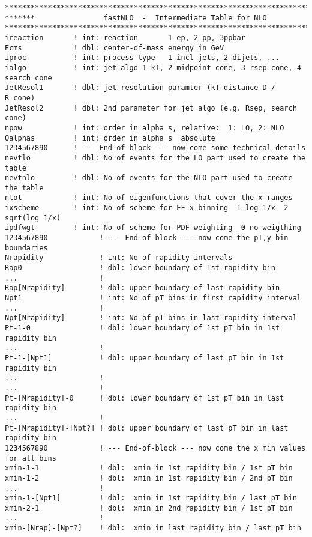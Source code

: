 {\small \footnotesize
\begin{verbatim} 
******************************************************************************
*******                fastNLO  -  Intermediate Table for NLO  
******************************************************************************
ireaction       ! int: reaction       1 ep, 2 pp, 3ppbar
Ecms            ! dbl: center-of-mass energy in GeV
iproc           ! int: process type   1 incl jets, 2 dijets, ...
ialgo           ! int: jet algo 1 kT, 2 midpoint cone, 3 rsep cone, 4 search cone 
JetResol1       ! dbl: jet resolution paramter (kT distance D / R_cone)
JetResol2       ! dbl: 2nd parameter for jet algo (e.g. Rsep, search cone)
npow            ! int: order in alpha_s, relative:  1: LO, 2: NLO
Oalphas         ! int: order in alpha_s  absolute
1234567890      ! --- End-of-block --- now come some technical details
nevtlo          ! dbl: No of events for the LO part used to create the table
nevtnlo         ! dbl: No of events for the NLO part used to create the table
ntot            ! int: No of eigenfunctions that cover the x-ranges 
ixscheme        ! int: No of scheme for EF x-binning  1 log 1/x  2 sqrt(log 1/x)
ipdfwgt         ! int: No of scheme for PDF weighting  0 no weigthing
1234567890            ! --- End-of-block --- now come the pT,y bin boundaries
Nrapidity             ! int: No of rapidity intervals
Rap0                  ! dbl: lower boundary of 1st rapidity bin
...                   !
Rap[Nrapidity]        ! dbl: upper boundary of last rapidity bin
Npt1                  ! int: No of pT bins in first rapidity interval
...                   !
Npt[Nrapidity]        ! int: No of pT bins in last rapidity interval
Pt-1-0                ! dbl: lower boundary of 1st pT bin in 1st rapidity bin
...                   !
Pt-1-[Npt1]           ! dbl: upper boundary of last pT bin in 1st rapidity bin
...                   !
...                   !
Pt-[Nrapidity]-0      ! dbl: lower boundary of 1st pT bin in last rapidity bin
...                   ! 
Pt-[Nrapidity]-[Npt?] ! dbl: upper boundary of last pT bin in last rapidity bin
1234567890            ! --- End-of-block --- now come the x_min values for all bins
xmin-1-1              ! dbl:  xmin in 1st rapidity bin / 1st pT bin
xmin-1-2              ! dbl:  xmin in 1st rapidity bin / 2nd pT bin
...                   !
xmin-1-[Npt1]         ! dbl:  xmin in 1st rapidity bin / last pT bin
xmin-2-1              ! dbl:  xmin in 2nd rapidity bin / 1st pT bin
...                   !
xmin-[Nrap]-[Npt?]    ! dbl:  xmin in last rapidity bin / last pT bin

\end{verbatim}}
